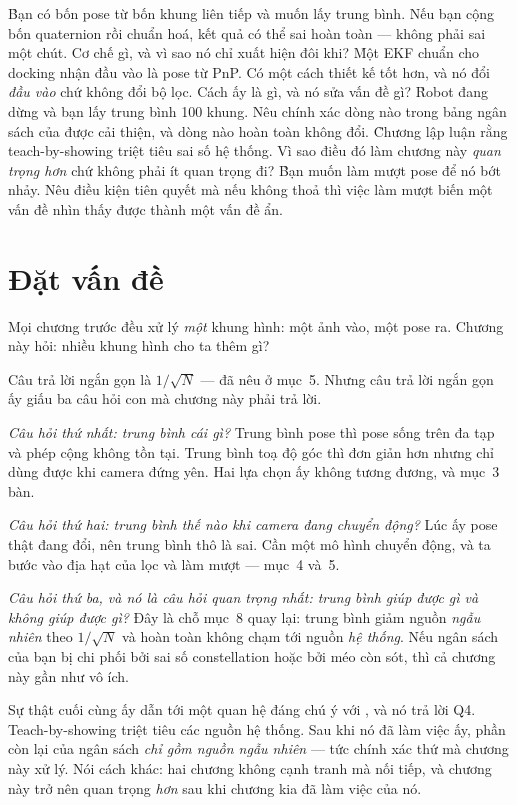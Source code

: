 \documentclass[../../marker.tex]{subfiles}
\begin{document}
\begin{khoigoi}
\h{Bạn có bốn pose từ bốn khung liên tiếp và muốn lấy trung bình. Nếu bạn cộng bốn quaternion rồi chuẩn hoá, kết quả có thể sai hoàn toàn --- không phải sai một chút. Cơ chế gì, và vì sao nó chỉ xuất hiện đôi khi?}
\h{Một EKF chuẩn cho docking nhận đầu vào là pose từ PnP. Có một cách thiết kế tốt hơn, và nó đổi \emph{đầu vào} chứ không đổi bộ lọc. Cách ấy là gì, và nó sửa vấn đề gì?}
\h{Robot đang dừng và bạn lấy trung bình 100 khung. Nêu chính xác dòng nào trong bảng ngân sách của  được cải thiện, và dòng nào hoàn toàn không đổi.}
\h{Chương  lập luận rằng teach-by-showing triệt tiêu sai số hệ thống. Vì sao điều đó làm chương này \emph{quan trọng hơn} chứ không phải ít quan trọng đi?}
\h{Bạn muốn làm mượt pose để nó bớt nhảy. Nêu điều kiện tiên quyết mà nếu không thoả thì việc làm mượt biến một vấn đề nhìn thấy được thành một vấn đề ẩn.}
\end{khoigoi}

\section{Đặt vấn đề}

Mọi chương trước đều xử lý \emph{một} khung hình: một ảnh vào, một pose ra. Chương này hỏi: nhiều khung hình cho ta thêm gì?

Câu trả lời ngắn gọn là \(1/\sqrt{N}\) --- đã nêu ở  mục~5. Nhưng câu trả lời ngắn gọn ấy giấu ba câu hỏi con mà chương này phải trả lời.

\emph{Câu hỏi thứ nhất: trung bình cái gì?} Trung bình pose thì pose sống trên đa tạp và phép cộng không tồn tại. Trung bình toạ độ góc thì đơn giản hơn nhưng chỉ dùng được khi camera đứng yên. Hai lựa chọn ấy không tương đương, và mục~3 bàn.

\emph{Câu hỏi thứ hai: trung bình thế nào khi camera đang chuyển động?} Lúc ấy pose thật đang đổi, nên trung bình thô là sai. Cần một mô hình chuyển động, và ta bước vào địa hạt của lọc và làm mượt --- mục~4 và~5.

\emph{Câu hỏi thứ ba, và nó là câu hỏi quan trọng nhất: trung bình giúp được gì và không giúp được gì?} Đây là chỗ  mục~8 quay lại: trung bình giảm nguồn \emph{ngẫu nhiên} theo \(1/\sqrt{N}\) và hoàn toàn không chạm tới nguồn \emph{hệ thống}. Nếu ngân sách của bạn bị chi phối bởi sai số constellation hoặc bởi méo còn sót, thì cả chương này gần như vô ích.

Sự thật cuối cùng ấy dẫn tới một quan hệ đáng chú ý với , và nó trả lời Q4. Teach-by-showing triệt tiêu các nguồn hệ thống. Sau khi nó đã làm việc ấy, phần còn lại của ngân sách \emph{chỉ gồm nguồn ngẫu nhiên} --- tức chính xác thứ mà chương này xử lý. Nói cách khác: hai chương không cạnh tranh mà nối tiếp, và chương này trở nên quan trọng \emph{hơn} sau khi chương kia đã làm việc của nó.
\end{document}
